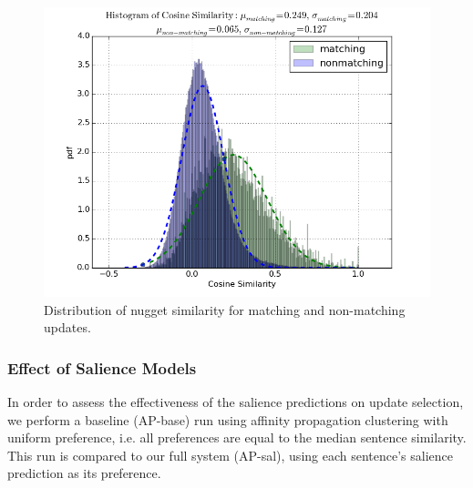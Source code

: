 \begin{figure}
\includegraphics[scale=.40]{match-dist.png} 
\caption{Distribution of nugget similarity for matching and non-matching 
updates.}
\end{figure}

\subsubsection{Effect of Salience Models}

In order to assess the effectiveness of the salience predictions on update
selection, we perform a baseline (AP-base) run using affinity propagation 
clustering
with uniform preference, i.e. all preferences are equal to the median sentence
similarity. This run is compared to our full system (AP-sal), using each
sentence's salience prediction as its preference. 


